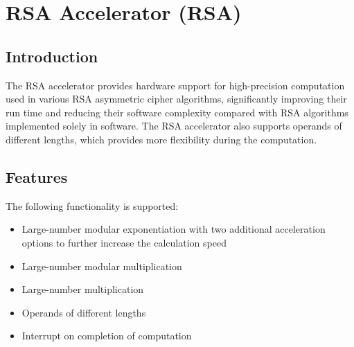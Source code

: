 \documentclass[main\_\_EN.tex]{subfiles}
\begin{document}

\ifglobal
\else
    {\let\clearpage\relax \listoftodos}
    {\let\clearpage\relax \listofdonetodos}
    \tableofcontents
\fi



\hypertarget{rsa}{}
\chapter{RSA Accelerator (RSA)}\label{mod:rsa}
\section{Introduction}

The RSA accelerator provides hardware support for high-precision computation used in various RSA asymmetric cipher algorithms, significantly improving their run time and reducing their software complexity compared with RSA algorithms implemented solely in software. The RSA accelerator also supports operands of different lengths, which provides more flexibility during the computation.


\section{Features}

The following functionality is supported:

\begin{itemize}
    \item Large-number modular exponentiation with two additional acceleration options to further increase the calculation speed
    \item Large-number modular multiplication
    \item Large-number multiplication
    \item Operands of different lengths
    \item Interrupt on completion of computation
\end{itemize}
\end{document}
